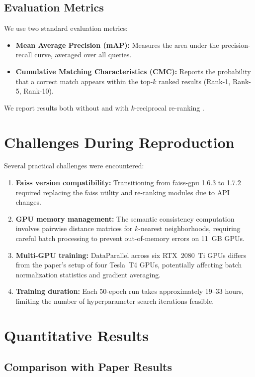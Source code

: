 \subsection{Evaluation Metrics}
We use two standard evaluation metrics:
\begin{itemize}
    \item \textbf{Mean Average Precision (mAP):} Measures the area under the precision-recall curve, averaged over all queries.
    \item \textbf{Cumulative Matching Characteristics (CMC):} Reports the probability that a correct match appears within the top-$k$ ranked results (Rank-1, Rank-5, Rank-10).
\end{itemize}
We report results both without and with $k$-reciprocal re-ranking \cite{zhong2017reranking}.

\section{Challenges During Reproduction}

Several practical challenges were encountered:
\begin{enumerate}
    \item \textbf{Faiss version compatibility:} Transitioning from faiss-gpu 1.6.3 to 1.7.2 required replacing the faiss utility and re-ranking modules due to API changes.
    \item \textbf{GPU memory management:} The semantic consistency computation involves pairwise distance matrices for $k$-nearest neighborhoods, requiring careful batch processing to prevent out-of-memory errors on 11~GB GPUs.
    \item \textbf{Multi-GPU training:} DataParallel across six RTX~2080~Ti GPUs differs from the paper's setup of four Tesla~T4 GPUs, potentially affecting batch normalization statistics and gradient averaging.
    \item \textbf{Training duration:} Each 50-epoch run takes approximately 19--33 hours, limiting the number of hyperparameter search iterations feasible.
\end{enumerate}

\section{Quantitative Results}

\subsection{Comparison with Paper Results}

